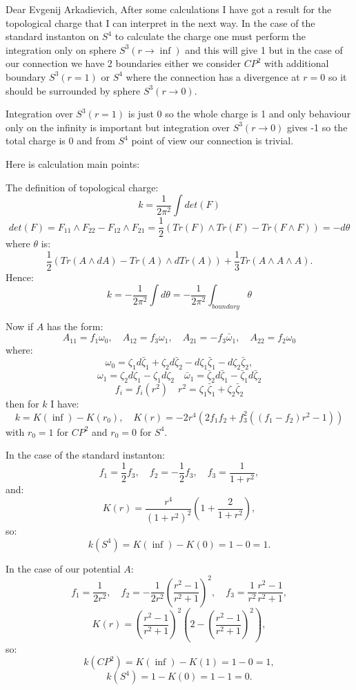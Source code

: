 


Dear Evgenij Arkadievich,
After some calculations I have got a result for the topological
charge that I can interpret in the next way. In the case of the
standard instanton on $S^4$ to calculate the charge one must
perform the integration only on sphere $S^3(r \rightarrow \inf)$
and this will give 1 but in the case of our connection we have 2
boundaries either we consider $CP^2$ with additional boundary
$S^3(r = 1)$ or $S^4$ where the connection has a divergence at $r
= 0$ so it should be surrounded by sphere $S^3(r \rightarrow 0)$.

Integration over $S^3(r = 1)$ is just 0 so the whole charge is 1
and only behaviour only on the infinity is important but
integration over $S^3(r \rightarrow 0)$ gives -1 so the total
charge is 0 and from $S^4$ point of view our connection is
trivial.   

Here is calculation main points:

The definition of topological charge:
$$
k = \frac{1}{2\pi^2}\int det(F)
$$
$$
det(F) = F_{11} \wedge F_{22} - F_{12} \wedge F_{21}
= \frac 1 2 (Tr(F) \wedge Tr(F) - Tr(F \wedge F)) = -d\theta
$$
where $\theta$ is:
$$
\frac 1 2 (Tr(A \wedge dA) - Tr(A) \wedge dTr(A)) + 
\frac 1 3 Tr(A \wedge A \wedge A).
$$ 
Hence:
$$
k = -\frac{1}{2\pi^2}\int d\theta = 
-\frac{1}{2\pi^2}\int_{boundary} \theta
$$

Now if $A$ has the form:
$$
A_{11} = f_1\omega_0, \quad A_{12} = f_3\omega_1, \quad
A_{21} = -f_3\bar\omega_1, \quad A_{22} = f_2\omega_0
$$
where:
$$
\omega_0 = \zeta_1d\bar\zeta_1 + \zeta_2d\bar\zeta_2
- d\zeta_1\bar\zeta_1 - d\zeta_2\bar\zeta_2,
$$
$$
\omega_1 = \zeta_2d\zeta_1 - \zeta_1d\zeta_2 \quad
\bar\omega_1 = \bar\zeta_2d\bar\zeta_1 - \bar\zeta_1d\bar\zeta_2
$$
$$
f_i = f_i(r^2) \quad r^2 = 
\zeta_1\bar\zeta_1 + \zeta_2\bar\zeta_2
$$
then for $k$ I have:
$$
k = K(\inf) - K(r_0), \quad
K(r) = -2r^4(2f_1f_2 + f_3^2((f_1 - f_2)r^2 - 1)) 
$$
with $r_0 = 1$ for $CP^2$ and $r_0 = 0$ for $S^4$.

In the case of the standard instanton:
$$
f_1 = \frac{1}{2}f_3, \quad 
f_2 = -\frac{1}{2}f_3, \quad
f_3 = \frac{1}{1 + r^2},
$$ 
and:
$$
K(r) = \frac{r^4}{(1 + r^2)^2}(1 + \frac{2}{1 + r^2}),
$$
so:
$$
k(S^4) = K(\inf) - K(0) = 1 - 0 = 1.
$$

In the case of our potential $A$:
$$
f_1 = \frac{1}{2r^2}, \quad 
f_2 = -\frac{1}{2r^2} \left(\frac{r^2 - 1}{r^2 + 1}\right)^2,
\quad
f_3 =  \frac{1}{r^2} \frac{r^2 - 1}{r^2 + 1},
$$
$$ 
K(r) = \left(\frac{r^2 - 1}{r^2 + 1}\right)^2
(2 - \left(\frac{r^2 - 1}{r^2 + 1}\right)^2),
$$ 
so:
$$
 k(CP^2) = K(\inf) - K(1) = 1 - 0 = 1,
$$
$$
 k(S^4) = 1 - K(0) = 1 - 1 = 0.
$$

